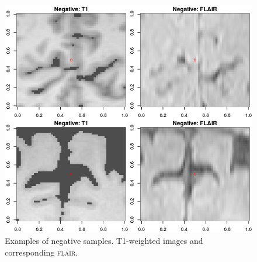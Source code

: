 \begin{figure}[ht]
\centering
\includegraphics[width=\linewidth]{Images/6_negatives.png}
\caption{Examples of negative samples. T1-weighted images and corresponding \textsc{flair}.}
\label{data-negatives}
\end{figure}

%
%
%
%

